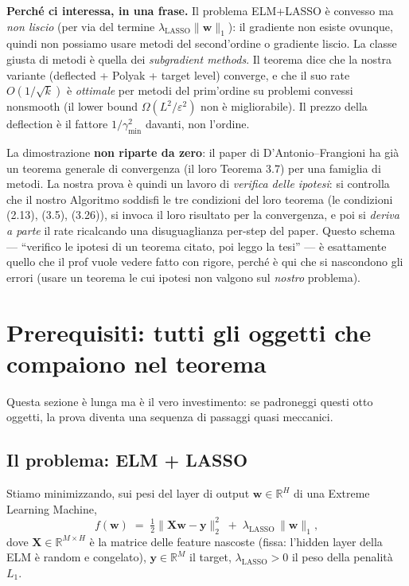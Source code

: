 \documentclass[11pt,a4paper]{article}
\theoremstyle{definition}
\newcommand{\w}{\bm{w}}
\newcommand{\X}{\bm{X}}
\newcommand{\y}{\bm{y}}
\newcommand{\gmin}{\gamma_{\min}}
\newcommand{\eps}{\varepsilon}
\newcommand{\norm}[1]{\lVert #1\rVert}
\newcommand{\R}{\mathbb{R}}
\newcommand{\lasso}{\lambda_{\mathrm{LASSO}}}
\begin{document}
\begin{keybox}
\textbf{Perché ci interessa, in una frase.} Il problema ELM+LASSO è convesso ma
\emph{non liscio} (per via del termine $\lasso\norm{\w}_1$): il gradiente non esiste ovunque,
quindi non possiamo usare metodi del second'ordine o gradiente liscio. La classe giusta di
metodi è quella dei \emph{subgradient methods}. Il teorema dice che la nostra variante
(deflected + Polyak + target level) converge, e che il suo rate $O(1/\sqrt{k})$ è
\emph{ottimale} per metodi del prim'ordine su problemi convessi nonsmooth (il lower bound
$\Omega(L^2/\eps^2)$ non è migliorabile). Il prezzo della deflection è il fattore
$1/\gmin^2$ davanti, non l'ordine.
\end{keybox}

La dimostrazione \textbf{non riparte da zero}: il paper di D'Antonio--Frangioni ha già un
teorema generale di convergenza (il loro Teorema 3.7) per una famiglia di metodi. La nostra
prova è quindi un lavoro di \emph{verifica delle ipotesi}: si controlla che il nostro
Algoritmo soddisfi le tre condizioni del loro teorema (le condizioni (2.13), (3.5), (3.26)),
si invoca il loro risultato per la convergenza, e poi si \emph{deriva a parte} il rate
ricalcando una disuguaglianza per-step del paper. Questo schema --- ``verifico le ipotesi di
un teorema citato, poi leggo la tesi'' --- è esattamente quello che il prof vuole vedere fatto
con rigore, perché è qui che si nascondono gli errori (usare un teorema le cui ipotesi non
valgono sul \emph{nostro} problema).

\section{Prerequisiti: tutti gli oggetti che compaiono nel teorema}
\label{sec:prereq}

Questa sezione è lunga ma è il vero investimento: se padroneggi questi otto oggetti, la prova
diventa una sequenza di passaggi quasi meccanici.

\subsection{Il problema: ELM + LASSO}
\label{sub:problema}

Stiamo minimizzando, sui pesi del layer di output $\w\in\R^H$ di una Extreme Learning Machine,
\begin{equation}\label{eq:problema}
f(\w) \;=\; \tfrac12\norm{\X\w-\y}_2^2 \;+\; \lasso\,\norm{\w}_1,
\end{equation}
dove $\X\in\R^{M\times H}$ è la matrice delle feature nascoste (fissa: l'hidden layer della ELM
è random e congelato), $\y\in\R^M$ il target, $\lasso>0$ il peso della penalità $L_1$.
\end{document}
